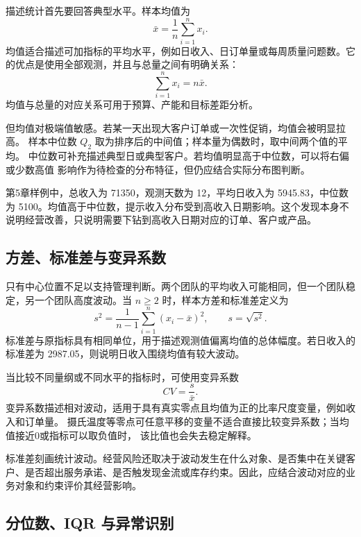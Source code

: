 描述统计首先要回答典型水平。样本均值为
\[
\bar x=\frac{1}{n}\sum_{i=1}^n x_i.
\]
均值适合描述可加指标的平均水平，例如日收入、日订单量或每周质量问题数。它的优点是使用全部观测，并且与总量之间有明确关系：
\[
\sum_{i=1}^n x_i=n\bar x.
\]
均值与总量的对应关系可用于预算、产能和目标差距分析。

但均值对极端值敏感。若某一天出现大客户订单或一次性促销，均值会被明显拉高。
样本中位数 \(Q_2\) 取为排序后的中间值；样本量为偶数时，取中间两个值的平均。
中位数可补充描述典型日或典型客户。若均值明显高于中位数，可以将右偏或少数高值
影响作为待检查的分布特征，但仍应结合实际分布图判断。

\begin{example}[日收入的中心位置]
第5章样例中，总收入为 71350，观测天数为 12，平均日收入为 5945.83，中位数为 5100。均值高于中位数，提示收入分布受到高收入日期影响。这个发现本身不说明经营改善，只说明需要下钻到高收入日期对应的订单、客户或产品。
\end{example}

\subsection{方差、标准差与变异系数}

只有中心位置不足以支持管理判断。两个团队的平均收入可能相同，但一个团队稳定，另一个团队高度波动。当 \(n\ge2\) 时，样本方差和标准差定义为
\[
s^2=\frac{1}{n-1}\sum_{i=1}^n(x_i-\bar x)^2,\qquad s=\sqrt{s^2}.
\]
标准差与原指标具有相同单位，用于描述观测值偏离均值的总体幅度。若日收入的标准差为 2987.05，则说明日收入围绕均值有较大波动。

当比较不同量纲或不同水平的指标时，可使用变异系数
\[
CV=\frac{s}{\bar x}.
\]
变异系数描述相对波动，适用于具有真实零点且均值为正的比率尺度变量，例如收入和订单量。
摄氏温度等零点可任意平移的变量不适合直接比较变异系数；当均值接近0或指标可以取负值时，
该比值也会失去稳定解释。

\begin{remark}
标准差刻画统计波动。经营风险还取决于波动发生在什么对象、是否集中在关键客户、是否超出服务承诺、是否触发现金流或库存约束。因此，应结合波动对应的业务对象和约束评价其经营影响。
\end{remark}

\subsection{分位数、IQR 与异常识别}

